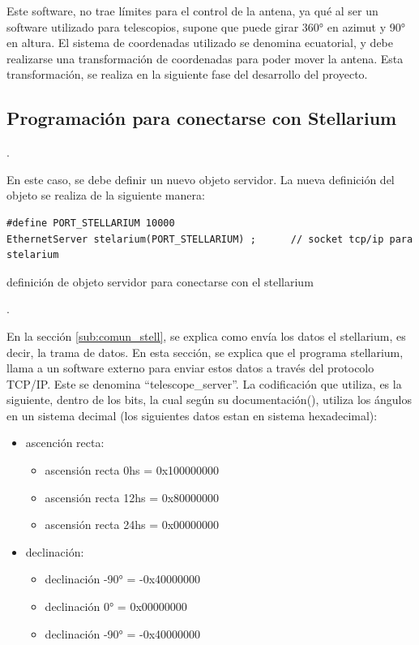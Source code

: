 Este software, no trae límites para el control de la antena, ya qué al ser un software utilizado para telescopios, supone que puede girar 360° en azimut y 90° en altura. El sistema de coordenadas utilizado se denomina ecuatorial, y debe realizarse una transformación de coordenadas para poder mover la antena. Esta transformación, se realiza en la siguiente fase del desarrollo del proyecto. 



\subsection{Programación para conectarse con Stellarium}. 

En este caso, se debe definir un nuevo objeto servidor. La nueva definición del objeto se realiza de la siguiente manera: 

\begin{listing}[ht]
	\begin{verbatim}
#define PORT_STELLARIUM 10000
EthernetServer stelarium(PORT_STELLARIUM) ;      // socket tcp/ip para stelarium 
	\end{verbatim}
\caption{definición de objeto servidor para conectarse con el stellarium}. 
\end{listing}

En la sección \ref{sub:comun_stell}, se explica como envía los datos el stellarium, es decir, la trama de datos. En esta sección, se explica que el programa stellarium, llama a un software externo para enviar estos datos a través del protocolo TCP/IP. Este se denomina ``telescope\_server''. La codificación que utiliza, es la siguiente, dentro de los bits, la cual según su documentación(\cite{telscopeserv}), utiliza los ángulos en un sistema decimal (los siguientes datos estan en sistema hexadecimal): 

\begin{itemize}
	\item ascención recta: 
		\begin{itemize}
		 \item	ascensión recta 0hs  = 0x100000000   		
		 \item	ascensión recta 12hs = 0x80000000 
		 \item	ascensión recta 24hs = 0x00000000
	\end{itemize}
	\item declinación: 
		\begin{itemize}
		  \item	declinación -90° = -0x40000000
		  \item	declinación  0°  =  0x00000000
		  \item	declinación -90° = -0x40000000
		\end{itemize}
\end{itemize}

